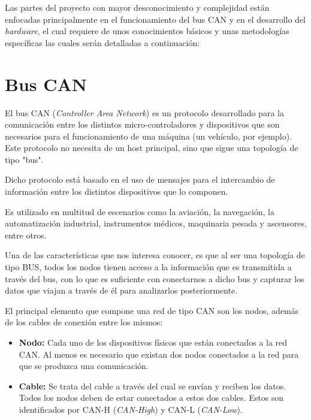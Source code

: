 
Las partes del proyecto con mayor desconocimiento y complejidad están enfocadas principalmente en el funcionamiento del bus CAN y en el desarrollo del \emph{hardware}, el cual requiere de unos conocimientos básicos y unas metodologías específicas las cuales serán detalladas a continuación:

\section{Bus CAN}\label{bus_can}

El bus CAN (\emph{Controller Area Network})\cite{wiki:can} es un protocolo desarrollado para la comunicación entre los distintos micro-controladores y dispositivos que son necesarios para el funcionamiento de una máquina (un vehículo, por ejemplo). Este protocolo no necesita de un host principal, sino que sigue una topología de tipo "bus".


Dicho protocolo está basado en el uso de mensajes para el intercambio de información entre los distintos dispositivos que lo componen.

Es utilizado en multitud de escenarios como la aviación, la navegación, la automatización industrial, instrumentos médicos, maquinaria pesada y ascensores, entre otros.

Una de las características que nos interesa conocer, es que al ser una topología de tipo BUS, todos los nodos tienen acceso a la información que es transmitida a través del bus, con lo que es suficiente con conectarnos a dicho bus y capturar los datos que viajan a través de él para analizarlos posteriormente.


El principal elemento que compone una red de tipo CAN son los nodos, además de los cables de conexión entre los mismos:

\begin{itemize}
\item
\textbf{Nodo:} Cada uno de los dispositivos físicos que están conectados a la red CAN. Al menos es necesario que existan dos nodos conectados a la red para que se produzca una comunicación.
\item
\textbf{Cable:} Se trata del cable a través del cual se envían y reciben los datos. Todos los nodos deben de estar conectados a estos dos cables. Estos son identificados por CAN-H (\emph{CAN-High}) y CAN-L (\emph{CAN-Low}).
\end{itemize}

